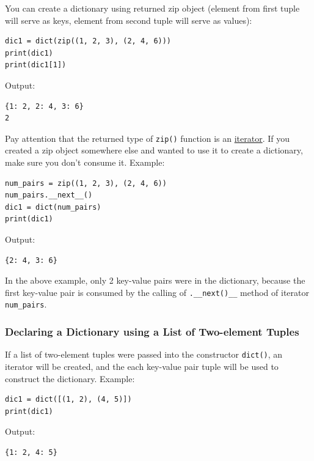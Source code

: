 \documentclass[12pt]{book}
\begin{document}
You can create a dictionary using returned zip object (element from first tuple will serve as keys, element from second tuple will serve as values):
\begin{verbatim}
dic1 = dict(zip((1, 2, 3), (2, 4, 6)))
print(dic1)
print(dic1[1])
\end{verbatim}
Output:
\begin{verbatim}
{1: 2, 2: 4, 3: 6}
2
\end{verbatim}

Pay attention that the returned type of \texttt{zip()} function is an \hyperref[org49c6fd0]{iterator}. If you created a zip object somewhere else and wanted to use it to create a dictionary, make sure you don't consume it. Example:
\begin{verbatim}
num_pairs = zip((1, 2, 3), (2, 4, 6))
num_pairs.__next__()
dic1 = dict(num_pairs)
print(dic1)
\end{verbatim}
Output:
\begin{verbatim}
{2: 4, 3: 6}
\end{verbatim}
In the above example, only 2 key-value pairs were in the dictionary, because the first key-value pair is consumed by the calling of \texttt{.\_\_next()\_\_} method of iterator \texttt{num\_pairs}.
\subsubsection{Declaring a Dictionary using a List of Two-element Tuples}
\label{sec:org506cbdd}
If a list of two-element tuples were passed into the constructor \texttt{dict()}, an iterator will be created, and the each key-value pair tuple will be used to construct the dictionary. Example:
\begin{verbatim}
dic1 = dict([(1, 2), (4, 5)])
print(dic1)
\end{verbatim}
Output:
\begin{verbatim}
{1: 2, 4: 5}
\end{verbatim}
\end{document}
